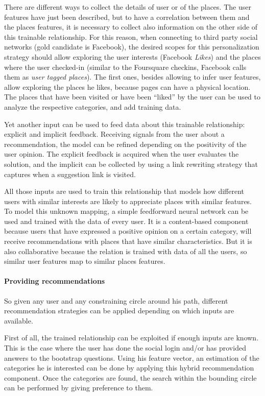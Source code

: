 There are different ways to collect the details of user or of the places. The user features have just been described, but to have a correlation between them and the places features, it is necessary to collect also information on the other side of this trainable relationship. For this reason, when connecting to third party social networks (gold candidate is Facebook), the desired scopes for this personalization strategy should allow exploring the user interests (Facebook \textit{Likes}) and the places where the user checked-in (similar to the Foursquare checkins, Facebook calls them as \textit{user tagged places}). The first ones, besides allowing to infer user features, allow exploring the places he likes, because pages can have a physical location. The places that have been visited or have been ``liked'' by the user can be used to analyze the respective categories, and add training data.

Yet another input can be used to feed data about this trainable relationship: explicit and implicit feedback. Receiving signals from the user about a recommendation, the model can be refined depending on the positivity of the user opinion. The explicit feedback is acquired when the user evaluates the solution, and the implicit can be collected by using a link rewriting strategy that captures when a suggestion link is visited.

All those inputs are used to train this relationship that models how different users with similar interests are likely to appreciate places with similar features. To model this unknown mapping, a simple feedforward neural network can be used and trained with the data of every user. It is a content-based component because users that have expressed a positive opinion on a certain category, will receive recommendations with places that have similar characteristics. But it is also collaborative because the relation is trained with data of all the users, so similar user features map to similar places features.

\paragraph{Providing recommendations}
So given any user and any constraining circle around his path, different recommendation strategies can be applied depending on which inputs are available.

First of all, the trained relationship can be exploited if enough inputs are known. This is the case where the user has done the social login and/or has provided answers to the bootstrap questions. Using his feature vector, an estimation of the categories he is interested can be done by applying this hybrid recommendation component. Once the categories are found, the search within the bounding circle can be performed by giving preference to them.

